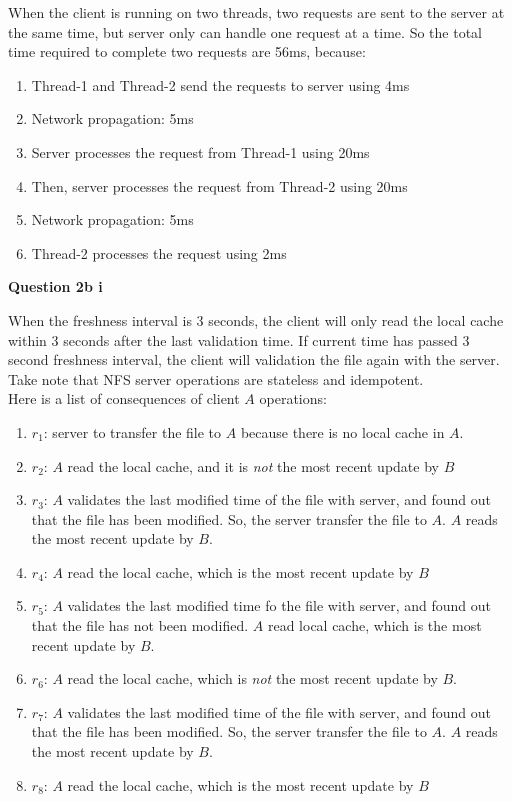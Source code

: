 \documentclass[11pt,a4paper]{report}
\begin{document}
\begin{multicols*}{2}
\noindent When the client is running on two threads, two requests are sent to the server at the same time, but server only can handle one request at a time. So the total time required to complete two requests are 56ms, because:
\begin{enumerate}
  \item Thread-1 and Thread-2 send the requests to server using 4ms
  \item Network propagation: 5ms
  \item Server processes the request from Thread-1 using 20ms
  \item Then, server processes the request from Thread-2 using 20ms
  \item Network propagation: 5ms
  \item Thread-2 processes the request using 2ms
\end{enumerate}

\noindent \textbf{Question 2b i}

\noindent When the freshness interval is 3 seconds, the client will only read the local cache within 3 seconds after the last validation time. If current time has passed 3 second freshness interval, the client will validation the file again with the server.\\

\noindent Take note that NFS server operations are stateless and idempotent.\\

\noindent Here is a list of consequences of client $A$ operations:
\begin{enumerate}
  \item $r_1$: server to transfer the file to $A$ because there is no local cache in $A$.
  \item $r_2$: $A$ read the local cache, and it is \emph{not} the most recent update by $B$
  \item $r_3$: $A$ validates the last modified time of the file with server, and found out that the file has been modified. So, the server transfer the file to $A$. $A$ reads the most recent update by $B$.
  \item $r_4$: $A$ read the local cache, which is the most recent update by $B$
  \item $r_5$: $A$ validates the last modified time fo the file with server, and found out that the file has not been modified. $A$ read local cache, which is the most recent update by $B$.
  \item $r_6$: $A$ read the local cache, which is \emph{not} the most recent update by $B$.
  \item $r_7$: $A$ validates the last modified time of the file with server, and found out that the file has been modified. So, the server transfer the file to $A$. $A$ reads the most recent update by $B$.
  \item $r_8$: $A$ read the local cache, which is the most recent update by $B$
\end{enumerate}


\end{multicols*}
\end{document}
